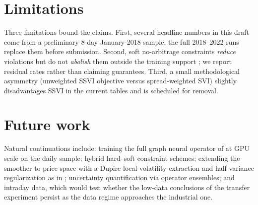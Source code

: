 \section{Limitations}
Three limitations bound the claims. First, several headline numbers in this
draft come from a preliminary 8-day January-2018 sample; the full 2018--2022
runs replace them before submission. Second, soft no-arbitrage constraints
\emph{reduce} violations but do not \emph{abolish} them outside the training
support \cite{chataigner2020deep}; we report residual rates rather than
claiming guarantees. Third, a small methodological asymmetry (unweighted
SSVI objective versus spread-weighted SVI) slightly disadvantages SSVI in
the current tables and is scheduled for removal.

\section{Future work}
Natural continuations include: training the full graph neural operator of
\cite{gonon2024operator} at GPU scale on the daily sample; hybrid hard--soft
constraint schemes; extending the smoother to price space with a Dupire
local-volatility extraction and half-variance regularization as in
\cite{chataigner2020deep}; uncertainty quantification via operator
ensembles; and intraday data, which would test whether the low-data
conclusions of the transfer experiment persist as the data regime approaches
the industrial one.

